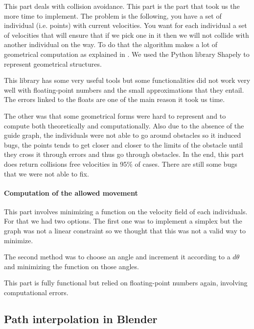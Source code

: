 This part deals with collision avoidance. This part is the part that
took us the more time to implement. The problem is the following, you
have a set of individual (i.e. points) with current velocities. You
want for each individual a set of velocities that will ensure that if
we pick one in it then we will not collide with another individual on
the way. To do that the algorithm makes a lot of geometrical
computation as explained in \cite{vandenBerg2011}. We used the Python
library Shapely to represent geometrical structures.

This library has some very useful tools but some functionalities did
not work very well with floating-point numbers and the small
approximations that they entail. The errors linked to the floats are
one of the main reason it took us time. 


The other was that some geometrical forms were hard to represent and
to compute both theoretically and computationally.  Also due to the
absence of the guide graph, the individuals were not able to go around
obstacles so it induced bugs, the points tends to get closer and
closer to the limits of the obstacle until they cross it through
errors and thus go through obstacles.  In the end, this part does
return collisions free velocities in 95\% of cases. There are still
some bugs that we were not able to fix.  %


\paragraph{Computation of the allowed movement}

This part involves minimizing a function on the velocity field of each
individuals. For that we had two options. The first one was to
implement a simplex but the graph was not a linear constraint so we
thought that this was not a valid way to minimize.

The second method was to choose an angle and increment it according to
a $d\theta$ and minimizing the function on those angles.


This part is fully functional but relied on floating-point numbers
again, involving computational errors.


\subsection{Path interpolation in Blender}

